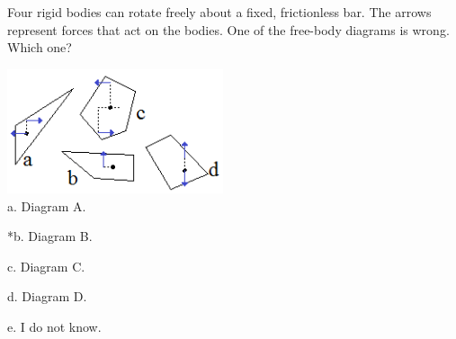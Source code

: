 
Four rigid bodies can rotate freely about a fixed, frictionless bar.  The arrows represent forces that act on the bodies. One of the free-body diagrams is wrong. Which one?

\includegraphics[width=2.5in]{../../Images/NewtonsLawsQ1.png} \\

a. Diagram A.

*b. Diagram B.

c. Diagram C.

d. Diagram D.

e. I do not know. \\
